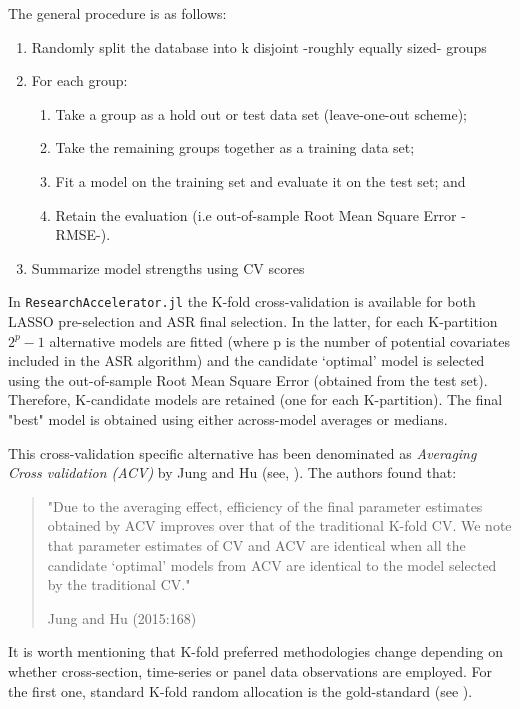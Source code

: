 \documentclass{article}
\begin{document}
The general procedure is as follows:

\begin{enumerate}
  \item Randomly split the database into k disjoint -roughly equally sized- groups
  \item For each group:
  \begin{enumerate}
    \item Take a group as a hold out or test data set (leave-one-out scheme);
    \item Take the remaining groups together as a training data set;
    \item Fit a model on the training set and evaluate it on the test set; and
    \item Retain the evaluation (i.e out-of-sample Root Mean Square Error -RMSE-).
  \end{enumerate}
  \item Summarize model strengths using CV scores
\end{enumerate}

In \verb|ResearchAccelerator.jl|  the K-fold cross-validation is available for both LASSO pre-selection and ASR final selection. In the latter, for each K-partition $2^{p} - 1$ alternative models are fitted (where p is the number of potential covariates included in the ASR algorithm) and the candidate ‘optimal’ model is selected using the out-of-sample Root Mean Square Error (obtained from the test set). Therefore, K-candidate models are retained (one for each K-partition). The final "best" model is obtained using either across-model averages or medians.

This cross-validation specific alternative has been denominated as \textit{Averaging Cross validation (ACV)} by Jung and Hu (see, \cite{jung2015}). The authors found that:

\begin{quote}
"Due to the averaging effect, efficiency of the final parameter estimates obtained by ACV improves over that of the traditional K-fold CV. We note that parameter estimates of CV and ACV are identical when all the candidate ‘optimal’ models from ACV are identical to the model selected by the traditional CV."

\hfill Jung and Hu (2015:168)
\end{quote}

It is worth mentioning that K-fold preferred methodologies change depending on whether cross-section, time-series or panel data observations are employed. For the first one, standard K-fold random allocation is the gold-standard (see \cite{arlot2010}). 
\end{document}
